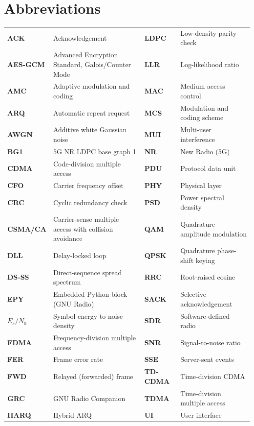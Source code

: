 \documentclass[11pt,a4paper,oneside]{report}
\newcommand{\EsNo}{\ensuremath{E_s/N_0}}
\begin{document}
\chapter*{Abbreviations}
\begin{center}
\small
\begin{tabular}{@{}>{\leavevmode\sffamily\bfseries\color{wldeep}}p{20mm}>{\raggedright\arraybackslash}p{50mm}@{\hspace{6mm}}>{\leavevmode\sffamily\bfseries\color{wldeep}}p{20mm}>{\raggedright\arraybackslash}p{48mm}@{}}
ACK & Acknowledgement & LDPC & Low-density parity-check \\
AES-GCM & Advanced Encryption Standard, Galois/Counter Mode & LLR & Log-likelihood ratio\\
AMC & Adaptive modulation and coding & MAC & Medium access control \\
ARQ & Automatic repeat request & MCS & Modulation and coding scheme \\
AWGN & Additive white Gaussian noise & MUI & Multi-user interference \\
BG1 & 5G NR LDPC base graph 1 & NR & New Radio (5G) \\
CDMA & Code-division multiple access & PDU & Protocol data unit \\
CFO & Carrier frequency offset & PHY & Physical layer \\
CRC & Cyclic redundancy check & PSD & Power spectral density \\
CSMA/CA & Carrier-sense multiple access with collision avoidance & QAM & Quadrature amplitude modulation\\
DLL & Delay-locked loop & QPSK & Quadrature phase-shift keying \\
DS-SS & Direct-sequence spread spectrum & RRC & Root-raised cosine \\
EPY & Embedded Python block (GNU Radio) & SACK & Selective acknowledgement \\
\EsNo & Symbol energy to noise density & SDR & Software-defined radio \\
FDMA & Frequency-division multiple access & SNR & Signal-to-noise ratio \\
FER & Frame error rate & SSE & Server-sent events \\
FWD & Relayed (forwarded) frame & TD-CDMA & Time-division CDMA \\
GRC & GNU Radio Companion & TDMA & Time-division multiple access \\
HARQ & Hybrid ARQ & UI & User interface \\
\end{tabular}
\end{center}
\end{document}
